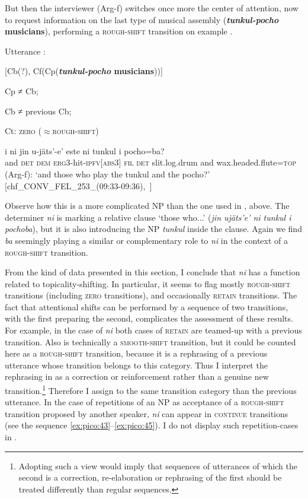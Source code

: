 \documentclass[output=paper
,modfonts
,nonflat]{langsci/langscibook}
\begin{document}
But then the interviewer (Arg-f) switches once more the center of attention, now to request information on the last type of musical assembly (\textbf{\textit{tunkul-pocho} musicians}), performing a \textsc{rough-shift} transition on example . 

\ea
Utterance :

[Cb(?), Cf(Cp(\textbf{\textit{tunkul-pocho} musicians}))]

Cp ≠ Cb;

Cb ≠ previous Cb;

Ct: \textsc{zero ($\approx$rough-shift)}
\z

\ea{}
\label{ex:pico:49}

\gll i ni jin  u-j\"ats'-e' este ni tunkul i pocho=ba?\\
and \textsc{det}  \textsc{dem} \textsc{erg3}-hit-\textsc{ipfv[abs3]} \textsc{fil} \textsc{det} slit.log.drum and wax.headed.flute=\textsc{top}\\
\glt (Arg-f): `and those who play the tunkul and the pocho?' [chf\_CONV\_FEL\_253\_(09:33-09:36),~\citealt{Delgado-Galvan2018archive}]
\z



Observe how this is a more complicated NP than the one used in , above. The determiner \textit{ni} is marking a relative clause `those who...' (\textit{jin  uj\"ats'e' ni tunkul i pochoba}), but it is also introducing the NP \textit{tunkul} inside the clause. Again we find \textit{ba} seemingly playing a similar or complementary role to \textit{ni} in the context of a \textsc{rough-shift} transition.

From the kind of data presented in this section, I conclude that \textit{ni} has a function related to topicality-shifting. In particular, it seems to flag mostly \textsc{rough-shift} transitions (including \textsc{zero} transitions), and occasionally \textsc{retain} transitions. 
The fact that attentional shifts can be performed by a sequence of two transitions, with the first preparing the second, complicates the assessment of these results. For example, in the case of \textit{ni} both cases of \textsc{retain} are teamed-up with a previous transition. 
Also  is technically a \textsc{smooth-shift} transition, but it could be counted here as a \textsc{rough-shift} transition, because it is a rephrasing of a previous utterance whose transition belongs to this category. Thus I interpret the rephrasing in  as a correction or reinforcement rather than a genuine new transition.\footnote{Adopting such a view would imply that sequences of utterances of which the second is a correction, re-elaboration or rephrasing of the first should be treated differently than regular sequences.} Therefore I assign to  the same transition category than the previous utterance. In the case of repetitions of an NP as acceptance of a \textsc{rough-shift} transition proposed by another speaker, \textit{ni} can appear in \textsc{continue} transitions (see the sequence \ref{ex:pico:43}--\ref{ex:pico:45}). I do not display such repetition-cases in .
\end{document}
